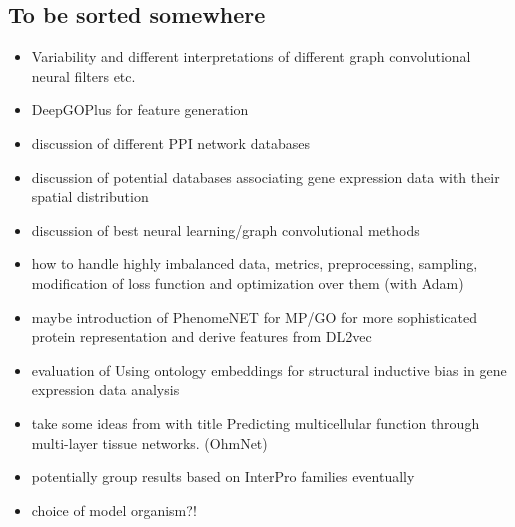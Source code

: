\documentclass[]{article}
\renewcommand{\cite}{\citep}
\begin{document}
\subsection*{To be sorted somewhere}
\begin{itemize}
	\item Variability and different interpretations of different graph convolutional neural filters \cite{GCNConv, GENConv2020, feng2022kergnns} etc.
	
	
	\item DeepGOPlus for feature generation \cite{DeepGoPlus}
	\item discussion of different PPI network databases \cite{STRINGv10}
	\item discussion of potential databases associating gene expression data with their spatial distribution \cite{hawrylycz_digital_2011}
	\item discussion of best neural learning/graph convolutional methods \cite{Pytorch, PytorchGeometric}
	\item how to handle highly imbalanced data, metrics, preprocessing, sampling, modification of loss function \cite{Jeni2013} and optimization over them (with Adam\cite{Adam2014})
	\item maybe introduction of PhenomeNET for MP/GO for more sophisticated protein representation \cite{PhenomeNET2011, GOoriginal2000, GOrecent2020, MP2009} and derive features from DL2vec \cite{DL2vec2020, Word2vec2013}
	\item evaluation of \glqq Using ontology embeddings for structural inductive bias in gene expression data analysis\grqq{}\cite{Trebacz2020}
	\item take some ideas from \citet{Zitnik2017} with title \glqq Predicting multicellular function through multi-layer tissue networks\grqq{}. (OhmNet)
	\item potentially group results based on InterPro\cite{Interpro2020} families eventually
	
	\item choice of model organism?!
\end{itemize}


\newpage
{}
\end{document}
